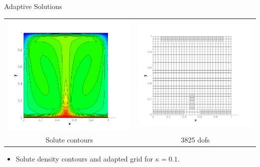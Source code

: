 \documentclass[compress,12pt]{beamer}
\begin{document}
\begin{frame}{Adaptive Solutions}
  {
    \begin{center}
      \begin{tabular}{cc} \\
	\includegraphics[width=.5\textwidth]{figures/s_adapt_kappa_0_10}&
	\includegraphics[width=.5\textwidth]{figures/grid_adapt_kappa_0_10}\\
	Solute contours &
	3825 dofs
      \end{tabular}
    \end{center}
    \begin{itemize}
      
    \item Solute density contours and adapted grid for $\kappa=0.1$.
    \end{itemize}
  }

  {
    \begin{center}


\end{center}}
\end{frame}
\end{document}
